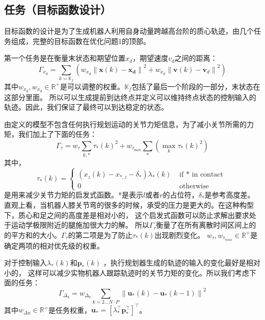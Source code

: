 \subsection{任务（目标函数设计）}
\label{cost_function}
目标函数的设计是为了生成机器人利用自身动量跨越高台阶的质心轨迹，由几个任务组成，完整的目标函数在优化问题1的顶部。

第一个任务是在衡量末状态和期望位置${x}_d$，期望速度${v}_d$之间的距离：
\begin{equation}
    \label{equ:cost_1}
    \Gamma_{x_d}=\sum_{k=\mathbb{K}_f}\left(w_{x_d}\left\|\boldsymbol{x}(k)-\boldsymbol{x}_{\boldsymbol{d}}\right\|^2+w_{\dot{x}_d}\left\|\boldsymbol{v}(k)-\boldsymbol{v}_d\right\|^2\right)
\end{equation}
其中$w_{x_d}, w_{\dot{x}_d} \in \mathbb{R}^{+}$是可以调整的权重。$\mathbb{K}_f$包括了最后一个阶段的一部分，末状态在这部分里面。
所以可以生成提前到达终点并定义可以维持终点状态的控制输入的轨迹。因此，我们保证了最终可以到达稳定的状态。

由定义的模型不包含任何执行规划运动的关节力矩信息，为了减小关节所需的力矩，我们加上了下面的任务：
\begin{equation}
    \label{equ:cost_2}
    \Gamma_\tau=w_\tau \sum_{k, *} \tau_*(k)^2+w_{\tau_{\max }} \sum_*\left(\max _k \tau_*(k)^2\right)
\end{equation}
其中，
\begin{equation}
    \label{equ:tau}
    \tau_*(k)= \begin{cases}\left(x_z(k)-x_{*, z}-\delta_*\right) \lambda_*(k) & \text { if } * \text { in contact } \\ 0 & \text { otherwise }\end{cases}
\end{equation}
是用来减少关节力矩的启发式函数。*是表示$l$或者$r$的占位符，$\delta_*$是参考高度差。
直观上看，当机器人膝关节弯的很多的时候，承受的压力是更大的。在这种构型下，质心和足之间的高度差是相对小的，
这个启发式函数可以防止求解出要求处于运动学极限附近的腿施加很大力的解。
所以$\Gamma_\tau$衡量了在所有离散时间区间上的的平方和的大小。$\Gamma_\tau$的第二项是为了防止$\tau_*(k)$出现剧烈变化。
$w_{\tau}, w_{\tau_{max}} \in \mathbb{R}^+$是确定两项的相对优先级的权重。

对于控制输入$\lambda_*(k)$和$\boldsymbol{p}_*(k)$ ，执行规划器生成的轨迹的输入的变化最好是相对小的，
这样可以减少实物机器人跟踪轨迹时的关节力矩的变化。所以我们考虑下面的任务：
\begin{equation}
    \label{equ:cost_3}
    \Gamma_{\Delta_u}=w_{\Delta_u} \sum_{k=2 \ldots N \cdot P}\left\|\boldsymbol{u}_*(k)-\boldsymbol{u}_*(k-1)\right\|^2
\end{equation}
其中$w_{\Delta u} \in \mathbb{R}^+$是任务权重，$\boldsymbol{u}_*=\left[\lambda_*^{\top} \boldsymbol{p}_*^{\top}\right]^{\top}$。

